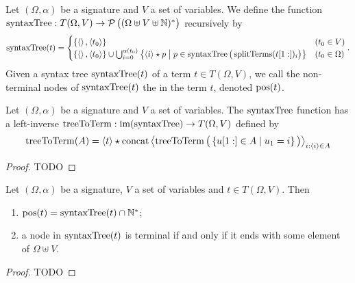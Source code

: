 \begin{definition}
Let $(\Omega, \alpha)$ be a signature and $V$ a set of variables. We define the \udef{$\syntaxTree$} function $\operatorname{syntaxTree}: T(\Omega, V) \to \operatorname{\mathcal{P}}\big((\Omega \uplus V \uplus \mathbb{N})^*\big)$ recursively by
\[ \operatorname{syntaxTree}(t) = \begin{cases}
\{\left\langle  \right\rangle, \left\langle t_0 \right\rangle\} & (t_0\in V) \\
\{\left\langle  \right\rangle, \left\langle t_0 \right\rangle\} \cup \bigcup_{i=0}^{\alpha(t_0)}\left\{ \left\langle i \right\rangle\star p \;\middle|\; p\in \operatorname{syntaxTree}\big(\operatorname{splitTerms}(t[1:])_i\big) \right\} & (t_0\in \Omega)
\end{cases}. \]
Given a syntax tree $\operatorname{syntaxTree}(t)$ of a term $t\in T(\Omega, V)$, we call the non-terminal nodes of $\operatorname{syntaxTree}(t)$ the  in the term $t$, denoted $\operatorname{pos}(t)$.
\end{definition}

\begin{lemma}
Let $(\Omega, \alpha)$ be a signature and $V$ a set of variables. The $\syntaxTree$ function has a left-inverse $\operatorname{treeToTerm}: \operatorname{im}(\operatorname{syntaxTree}) \to T(\Omega, V)$ defined by
\[ \operatorname{treeToTerm}(A) = \left\langle t \right\rangle \star \operatorname{concat} \left\langle \operatorname{treeToTerm}\big(\left\{ u[1:]\in A \;\middle|\; u_1 = i \right\}\big) \right\rangle_{i:\left\langle i \right\rangle\in A} \]
\end{lemma}
\begin{proof}
TODO
\end{proof}


\begin{lemma} \label{positionsSyntaxTreeNumeric}
Let $(\Omega, \alpha)$ be a signature, $V$ a set of variables and $t\in T(\Omega, V)$. Then
\begin{enumerate}
\item $\operatorname{pos}(t) = \operatorname{syntaxTree}(t) \cap \mathbb{N}^*$;
\item a node in $\operatorname{syntaxTree}(t)$ is terminal \textup{if and only if} it ends with some element of $\Omega \uplus V$.
\end{enumerate}
\end{lemma}
\begin{proof}
TODO
\end{proof}

